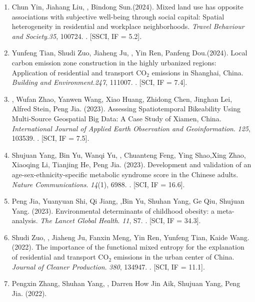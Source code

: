 \begin{enumerate}
\item
    Chun Yin, Jiahang Liu, \Shaoqing, Bindong Sun.(2024).
    Mixed land use has opposite associations with subjective well-being through social capital: Spatial heterogeneity in residential and workplace neighborhoods.
    \textit{Travel Behaviour and Society}.\textit{35}, 100724.
    . [SSCI, IF = 5.2].
\item
    Yunfeng Tian, Shudi Zuo, Jiaheng Ju, \Shaoqing, Yin Ren, Panfeng Dou.(2024).
    Local carbon emission zone construction in the highly urbanized regions: Application of residential and transport CO$_2$ emissions in Shanghai, China.
    \textit{Building and Environment}.\textit{247}, 111007.
    . [SCI, IF = 7.4].
\item
    \Shaoqing, Wufan Zhao, Yanwen Wang, Xiao Huang, Zhidong Chen, Jinghan Lei, Alfred Stein, Peng Jia. (2023).
    Assessing Spatiotemporal Bikeability Using Multi-Source Geospatial Big Data: A Case Study of Xiamen, China.
    \textit{International Journal of Applied Earth Observation and Geoinformation}. \textit{125}, 103539.
    . [SCI, IF = 7.5].
\item
    Shujuan Yang, Bin Yu, Wanqi Yu, \Shaoqing, Chuanteng Feng, Ying Shao,Xing Zhao, Xiaoqing Li, Tianjing He, Peng Jia. (2023).
    Development and validation of an age-sex-ethnicity-specific metabolic syndrome score in the Chinese adults.
    \textit{Nature Communications}. \textit{14}(1), 6988.
    . [SCI, IF = 16.6].
\item
    Peng Jia, Yuanyuan Shi, Qi Jiang, \Shaoqing,Bin Yu, Shuhan Yang, Ge Qiu, Shujuan Yang. (2023).
    Environmental determinants of childhood obesity: a meta-analysis.
    \textit{The Lancet Global Health}. \textit{11}, S7.
    . [SCI, IF = 34.3].
\item
    Shudi Zuo, \Shaoqing, Jiaheng Ju, Fanxin Meng, Yin Ren, Yunfeng Tian, Kaide Wang. (2022).
    The importance of the functional mixed entropy for the explanation of residential and transport CO$_2$ emissions in the urban center of China.
    \textit{Journal of Cleaner Production}. \textit{380}, 134947.
    . [SCI, IF = 11.1].
\item
    Pengxin Zhang, Shuhan Yang, \Shaoqing, Darren How Jin Aik, Shujuan Yang, Peng Jia. (2022).

\end{enumerate}
